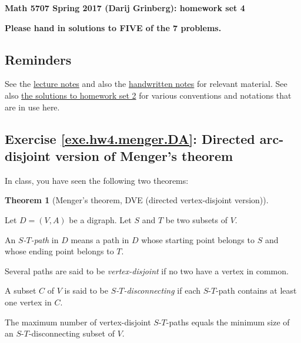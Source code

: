 \documentclass[numbers=enddot,12pt,final,onecolumn,notitlepage]{scrartcl}%
\theoremstyle{definition}
\newtheorem{theo}{Theorem}[section]
\newenvironment{theorem}[1][]
{\begin{theo}[#1]\begin{leftbar}}
{\end{leftbar}\end{theo}}
\newcommand{\tup}[1]{\left( #1 \right)}
\begin{document}
\begin{center}
\textbf{Math 5707 Spring 2017 (Darij Grinberg): homework set 4}


\textbf{Please hand in solutions to FIVE of the 7 problems.}
\end{center}


\subsection{Reminders}

See the
\href{http://www-users.math.umn.edu/~dgrinber/5707s17/nogra.pdf}{lecture notes}
and also the
\href{http://www-users.math.umn.edu/~dgrinber/5707s17/}{handwritten notes}
for relevant material.
See also
\href{http://www-users.math.umn.edu/~dgrinber/5707s17/hw2s.pdf}{the solutions to homework set 2}
for various conventions and notations that are in use here.

\subsection{Exercise \ref{exe.hw4.menger.DA}: Directed arc-disjoint
version of Menger's theorem}

In class, you have seen the following two theorems:

\begin{theorem}[Menger's theorem, DVE (directed vertex-disjoint
version)] \label{thm.menger.DVE}
Let $D = \tup{V, A}$ be a digraph.
Let $S$ and $T$ be two subsets of $V$.

An \textit{$S$-$T$-path} in $D$ means a path in $D$ whose starting
point belongs to $S$ and whose ending point belongs to $T$.

Several paths are said to be \textit{vertex-disjoint} if no two
have a vertex in common.

A subset $C$ of $V$ is said to be \textit{$S$-$T$-disconnecting} if
each $S$-$T$-path contains at least one vertex in $C$.

The maximum number of vertex-disjoint $S$-$T$-paths equals the
minimum size of an $S$-$T$-disconnecting subset of $V$.
\end{theorem}
\end{document}

